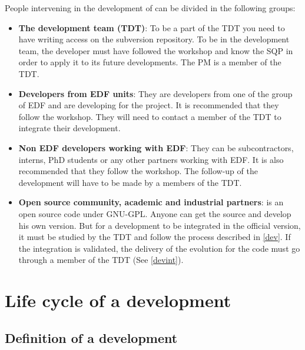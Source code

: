 People intervening in the development of \telemacsystem can be divided in the following
groups:
\begin{itemize}
\item \textbf{The \telemacsystem development team (TDT)}: To be a part of the TDT you
need to have writing access on the subversion repository. To be in the
development team, the developer must have followed the \telemacsystem workshop and know
the SQP in order to apply it to its future developments. The PM is a member of
the TDT.
\item \textbf{Developers from EDF units}: They are developers from one of the
group of EDF and are developing for the \telemacsystem project. It is recommended that
they follow the \telemacsystem workshop. They will need to contact a member of the TDT
to integrate their development.
\item \textbf{Non EDF developers working with EDF}: They can be subcontractors,
interns, PhD students or any other partners working with EDF. It is also
recommended that they follow the \telemacsystem workshop. The follow-up of the
development will have to be made by a members of the TDT.
\item \textbf{Open source community, academic and industrial partners}: \telemacsystem
is an open source code under GNU-GPL. Anyone can get the source and develop his
own version. But for a development to be integrated in the official version, it
must be studied by the TDT and follow the process described in \ref{dev}. If the
integration is validated, the delivery of the evolution for the code must go
through a member of the TDT (See \ref{devint}).
\end{itemize}

\section{Life cycle of a development}

\subsection{Definition of a development}
\label{defdev}

